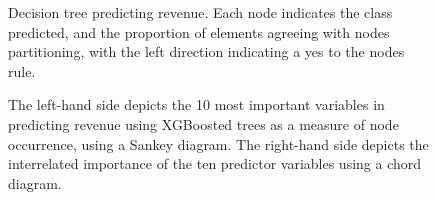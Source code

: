 \documentclass[review,12pt,authoryear]{elsarticle}
\begin{document}
\begin{linenumbers}
\begin{figure} 
  \caption{Decision tree predicting revenue. Each node indicates the class predicted, and the proportion of elements agreeing with nodes partitioning, with the left direction indicating a yes to the nodes rule.}\label{fig:revenue_tree}
 \end{figure}
 
 \begin{figure}
  \caption{The left-hand side depicts the 10 most important variables in predicting revenue using XGBoosted trees as a measure of node occurrence, using a Sankey diagram. The right-hand side depicts the interrelated importance of the ten predictor variables using a chord diagram.}\label{fig:revenue_sankey}
 \end{figure}


\end{linenumbers}
\end{document}
